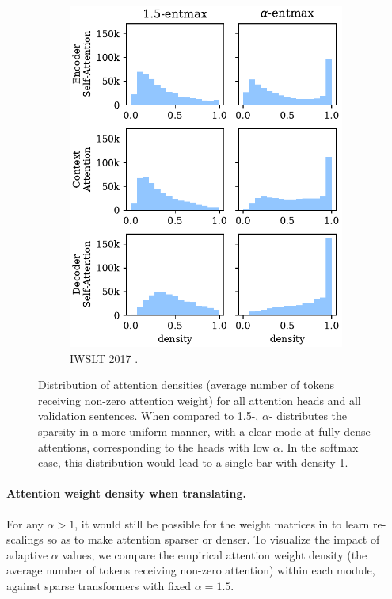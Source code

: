 \begin{figure}[!htbp]
\begin{subfigure}[b]{.48\linewidth}
        \includegraphics[width=\linewidth]{Figures/hist_densities_de.pdf}
        \caption{%
            \label{fig:hist_densities_de}%
            IWSLT 2017 .}
    \end{subfigure}
    \caption{%
        \label{fig:hist_densities}
        Distribution of attention densities (average number of tokens
        receiving non-zero attention weight) for all attention heads and all
        validation sentences.
        When compared to 1.5-\entmaxtext{}, $\alpha$-\entmaxtext{}
        distributes the sparsity in a more uniform manner, with a clear mode
        at fully dense attentions, corresponding to the heads with low
        $\alpha$. In the softmax case, this distribution would lead to a
        single bar with density 1.}
\end{figure}

\paragraph*{Attention weight density when translating.}
For any $\alpha>1$, it would still be possible for the weight
matrices in  to learn re-scalings so as to make
attention sparser or denser. To visualize the impact of adaptive
$\alpha$ values, we compare the empirical attention weight density
(the average number of tokens receiving non-zero attention) within
each module, against sparse transformers with fixed $\alpha=1.5$.

